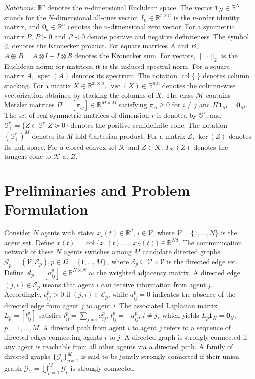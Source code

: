 \documentclass[conference]{IEEEtran}
\begin{document}
	\emph{Notations:}
	$\mathbb R^n$ denotes the $n$-dimensional Euclidean space. The vector \(\mathbf 1_N\in\mathbb R^N\) stands for the $N$-dimensional all-ones vector. \(I_n\in\mathbb R^{n\times n}\) is the $n$-order identity matrix, and \(\mathbf 0_n\in\mathbb R^n\) denotes the $n$-dimensional zero vector. For a symmetric matrix $P$, $P\succ0$ and $P\prec0$ denote positive and negative definiteness. The symbol $\otimes$ denotes the Kronecker product. For square matrices $A$ and $B$, $A\oplus B=A\otimes I+I\otimes B$ denotes the Kronecker sum. For vectors, $\|\cdot\|_2$ is the Euclidean norm; for matrices, it is the induced spectral norm. For a square matrix $A$, $\operatorname{spec}(A)$ denotes its spectrum. The notation $\operatorname{col}\{\cdot\}$ denotes column stacking. For a matrix $X\in\mathbb R^{m\times n}$, $\operatorname{vec}(X)\in\mathbb R^{mn}$ denotes the column-wise
	vectorization obtained by stacking the columns of $X$. The class $\mathcal M$ contains Metzler matrices
	$\Pi=[\pi_{ij}]\in\mathbb R^{M\times M}$ satisfying
	$\pi_{ij}\geq0$ for $i\ne j$ and
	$\Pi\mathbf 1_M=\mathbf 0_M$. The set of real symmetric matrices of dimension $r$ is denoted by $\mathbb S^r$, and
	$\mathbb S_+^r=\{Z\in\mathbb S^r:Z\succeq0\}$ denotes the
	positive-semidefinite cone. The notation $(\mathbb S_+^r)^M$
	denotes its $M$-fold Cartesian product. For a matrix $Z$,
	$\ker(Z)$ denotes its null space. For a closed convex set
	$\mathcal K$ and $Z\in\mathcal K$, $T_{\mathcal K}(Z)$ denotes
	the tangent cone to $\mathcal K$ at $Z$.
	
	\section{Preliminaries and Problem Formulation}
	
	Consider $N$ agents with states $x_i(t)\in\mathbb R^d$,
	$i\in\mathcal V$, where
	$\mathcal V=\{1,\ldots,N\}$ is the agent set. Define
	$
	x(t)
	=
	\operatorname{col}\{x_1(t),\ldots,x_N(t)\}
	\in\mathbb R^{Nd}.
	$
	The communication network of these $N$ agents switches among $M$ candidate directed
	graphs
	$
	\mathcal G_p=(\mathcal V,\mathcal E_p),
	p\in\Omega=\{1,\ldots,M\},
	$
	where $\mathcal E_p\subseteq\mathcal V\times\mathcal V$ is the
	directed edge set. Define
	$\mathcal A_p=[a_{ij}^p]\in\mathbb R^{N\times N}$ as the weighted
	adjacency matrix. A directed edge $(j,i)\in\mathcal E_p$ means that
	agent $i$ can receive information from agent $j$. Accordingly, $a_{ij}^p>0$ if $(j,i)\in\mathcal E_p$, while $a_{ij}^p=0$ indicates the absence of the directed edge from agent $j$ to agent $i$. The associated Laplacian matrix \(L_p=[l_{ij}^p]\) satisfies
	$l_{ii}^p=\sum_{j\ne i}a_{ij}^p$, $l_{ij}^p=-a_{ij}^p$, $i\ne j,$
	which yields
	$L_p\mathbf1_N=\mathbf0_N$, $p=1,\ldots,M.$
	A directed path from agent $i$ to agent $j$ refers to a sequence of directed edges connecting agents $i$ to $j$. A directed graph is strongly connected if any agent is reachable from all other agents via a directed path. A family of directed graphs
	$\{\mathcal G_p\}_{p=1}^{M}$ is said to be jointly strongly
	connected if their union graph
	$
	\mathcal G_U
	=
	\bigcup_{p=1}^{M}\mathcal G_p
	$
	is strongly connected.
	
\end{document}
